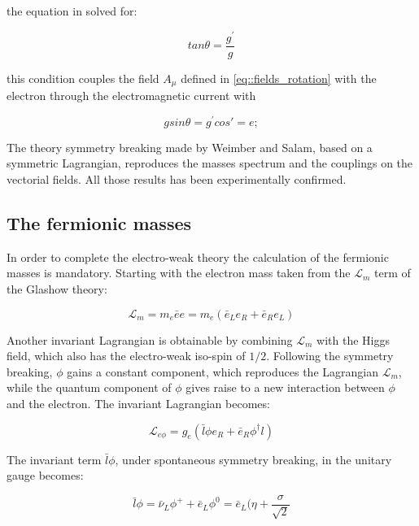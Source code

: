 the equation in solved for:

\begin{equation}
tan\theta = \dfrac{g^{\prime}}{g}
\label{eq::matrix_solution}
\end{equation}

this condition couples the field $A_{\mu}$ defined in \ref{eq::fields_rotation} with the electron through the electromagnetic current with

\begin{equation}
gsin\theta = g^{\prime} cos\prime = e; 
\end{equation}

The theory symmetry breaking made by Weimber and Salam, based on a symmetric Lagrangian, reproduces the masses spectrum and the couplings on the vectorial fields. All those results has been experimentally confirmed.

\clearpage

\subsection{The fermionic masses}

In order to complete the electro-weak theory the calculation of the fermionic masses is mandatory. Starting with the electron mass taken from the $\mathcal{L}_{m}$ term of the Glashow theory:

\begin{equation}
\mathcal{L}_{m} = m_{e}\bar{e}e = m_{e}(\bar{e}_{L}e_{R} + \bar{e}_{R}e_{L})
\end{equation}

Another invariant Lagrangian is obtainable by combining $\mathcal{L}_{m}$ with the Higgs field, which also has the electro-weak iso-spin of $1/2$. Following the symmetry breaking, $\phi$ gains a constant component, which reproduces the Lagrangian  $\mathcal{L}_{m}$, while the quantum component of $\phi$ gives raise to a new interaction between $\phi$ and the electron. The invariant Lagrangian becomes:

\begin{equation}
\mathcal{L}_{e\phi} = g_{e} (\bar{l}\phi e_{R} + \bar{e}_{R}\phi^{\dagger}l)
\end{equation}

The invariant term $\bar{l}\phi$, under spontaneous symmetry breaking, in the unitary gauge becomes:

\begin{equation}
\bar{l}\phi = \bar{\nu}_{L}\phi^{+} + \bar{e}_{L}\phi^{0} = \bar{e}_{L}(\eta + \dfrac{\sigma}{\sqrt{2}}
\end{equation}

